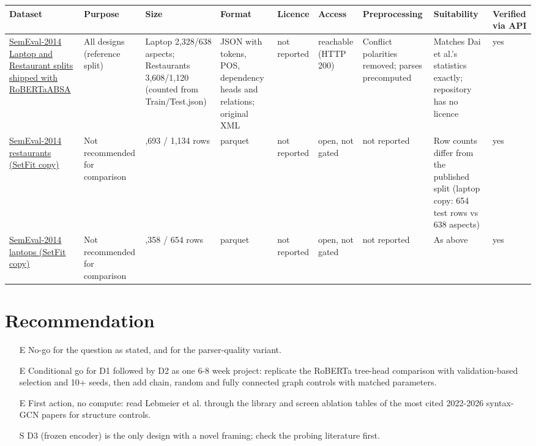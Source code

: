 \documentclass[11pt,a4paper]{article}
\begin{document}
{\small
\begin{longtable}{>{\raggedright\arraybackslash}p{}>{\raggedright\arraybackslash}p{}>{\raggedright\arraybackslash}p{}>{\raggedright\arraybackslash}p{}>{\raggedright\arraybackslash}p{}>{\raggedright\arraybackslash}p{}>{\raggedright\arraybackslash}p{}>{\raggedright\arraybackslash}p{}>{\raggedright\arraybackslash}p{}}
\toprule
\textbf{Dataset} & \textbf{Purpose} & \textbf{Size} & \textbf{Format} & \textbf{Licence} & \textbf{Access} & \textbf{Preprocessing} & \textbf{Suitability} & \textbf{Verified via API} \\
\midrule
\endhead
\href{https://github.com/ROGERDJQ/RoBERTaABSA/tree/main/Dataset}{SemEval-2014 Laptop and Restaurant splits shipped with RoBERTaABSA} & All designs (reference split) & Laptop 2,328/638 aspects; Restaurants 3,608/1,120 (counted from Train/Test.json) & JSON with tokens, POS, dependency heads and relations; original XML & not reported & reachable (HTTP 200) & Conflict polarities removed; parses precomputed & Matches Dai et al.'s statistics exactly; repository has no licence & yes \\
\href{https://huggingface.co/datasets/tomaarsen/setfit-absa-semeval-restaurants}{SemEval-2014 restaurants (SetFit copy)} & Not recommended for comparison & 3,693 / 1,134 rows & parquet & not reported & open, not gated & not reported & Row counts differ from the published split (laptop copy: 654 test rows vs 638 aspects) & yes \\
\href{https://huggingface.co/datasets/tomaarsen/setfit-absa-semeval-laptops}{SemEval-2014 laptops (SetFit copy)} & Not recommended for comparison & 2,358 / 654 rows & parquet & not reported & open, not gated & not reported & As above & yes \\
\bottomrule
\end{longtable}
}

\section{Recommendation}

\begin{itemize}
\item [E] No-go for the question as stated, and for the parser-quality variant.
\item [E] Conditional go for D1 followed by D2 as one 6-8 week project: replicate the RoBERTa tree-head comparison with validation-based selection and 10+ seeds, then add chain, random and fully connected graph controls with matched parameters.
\item [E] First action, no compute: read Lebmeier et al. through the library and screen ablation tables of the most cited 2022-2026 syntax-GCN papers for structure controls.
\item [S] D3 (frozen encoder) is the only design with a novel framing; check the probing literature first.
\end{itemize}
\end{document}
